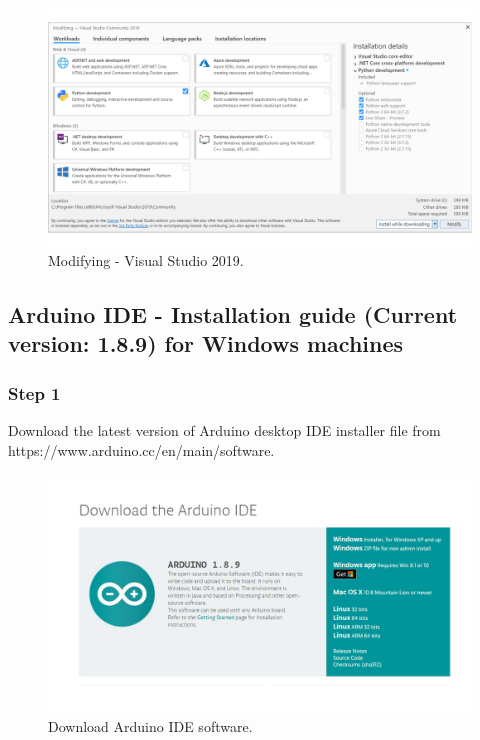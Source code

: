 \begin{refsection}
	\begin{figure}[H]
		\centering
		\includegraphics[width=1\linewidth]{./sdf/arduino_quantum_rx/figures/VSworkloads.pdf}
		\caption{Modifying - Visual Studio 2019.}
		\label{vstudioWorkloads}
	\end{figure}
	
	\subsection{Arduino IDE - Installation guide (Current version: 1.8.9) for Windows machines}
	
	\subsubsection{Step 1}
	
	Download the latest version of Arduino desktop IDE installer file from https://www.arduino.cc/en/main/software.
	
	\begin{figure}[H]
		\centering
		\includegraphics[width=0.86\linewidth]{./sdf/arduino_quantum_rx/figures/arduinoDownload.pdf}
		\caption{Download Arduino IDE software.}
		\label{arduinoDownload}
	\end{figure}
	

\end{refsection}
